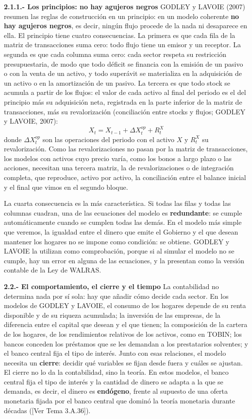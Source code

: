 \documentclass[10pt,a4paper]{article}
\newcommand{\authorfont}[1]{{\fontfamily{EBGaramond-TLF}\selectfont #1}}
\begin{document}
\textbf{2.1.1.- Los principios: no hay agujeros negros}
GODLEY y LAVOIE (2007) resumen las reglas de construcción en un principio: en un modelo coherente \textbf{no hay agujeros negros}, es decir, ningún flujo procede de la nada ni desaparece en ella. El principio tiene cuatro consecuencias. La primera es que cada fila de la matriz de transacciones suma cero: todo flujo tiene un emisor y un receptor. La segunda es que cada columna suma cero: cada sector respeta su restricción presupuestaria, de modo que todo déficit se financia con la emisión de un pasivo o con la venta de un activo, y todo superávit se materializa en la adquisición de un activo o en la amortización de un pasivo. La tercera es que todo stock se acumula a partir de los flujos: el valor de cada activo al final del periodo es el del principio más su adquisición neta, registrada en la parte inferior de la matriz de transacciones, más su revalorización (conciliación entre stocks y flujos; GODLEY y LAVOIE, 2007):
$$X_t=X_{t-1}+\Delta X^{op}_t+R^{X}_t$$
donde $\Delta X^{op}_t$ son las operaciones del periodo con el activo $X$ y $R^{X}_t$ su revalorización. Como las revalorizaciones no pasan por la matriz de transacciones, los modelos con activos cuyo precio varía, como los bonos a largo plazo o las acciones, necesitan una tercera matriz, la de revalorizaciones o de integración completa, que reproduce, activo por activo, la conciliación entre el balance inicial y el final que vimos en el segundo bloque.

La cuarta consecuencia es la más característica. Si todas las filas y todas las columnas cuadran, una de las ecuaciones del modelo es \textbf{redundante}: se cumple automáticamente cuando se cumplen todas las demás. En el modelo más simple que veremos, la igualdad entre el dinero que emite el Gobierno y el que desean mantener los hogares no se impone como condición: se obtiene. GODLEY y LAVOIE la utilizan como comprobación, porque si al simular el modelo no se cumple, hay un error en alguna de las ecuaciones, y la presentan como la versión contable de la Ley de WALRAS.

\textbf{2.2.- El comportamiento, el cierre y el tiempo}
La contabilidad no determina nada por sí sola: hay que añadir cómo decide cada sector. En los modelos de GODLEY y LAVOIE, el consumo de los hogares depende de su renta disponible y de su riqueza acumulada; la inversión de las empresas, de la diferencia entre el capital que desean y el que tienen; la composición de la cartera de los hogares, de los rendimientos relativos de los activos, como en TOBIN; los bancos conceden los préstamos que se les demandan a los prestatarios solventes; y el banco central fija el tipo de interés. Junto con esas relaciones, el modelo necesita un \textbf{cierre}: decidir qué variables se fijan desde fuera y cuáles se ajustan. El cierre no lo da la contabilidad, sino la teoría. En estos modelos, el banco central fija el tipo de interés y la cantidad de dinero se adapta a la que se demanda, es decir, el dinero es \textbf{endógeno}, frente al supuesto de una oferta monetaria fijada por el banco central que dominó la teoría monetaria durante décadas ([\authorfont{Ver Tema 3.A.36}]).
\end{document}
